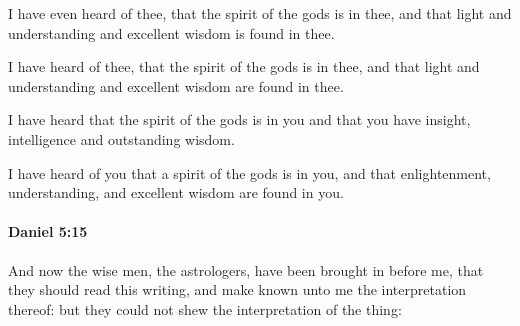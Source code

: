 			I have even heard of thee, that the spirit of the gods is in thee, and that light and understanding and excellent wisdom is found in thee.

			\begin{versebox}
					\item[BHS] 
					\item[ASV] I have heard of thee, that the spirit of the gods is in thee, and that light and understanding and excellent wisdom are found in thee.
					\item[NIV] I have heard that the spirit of the gods is in you and that you have insight, intelligence and outstanding wisdom.
					\item[NRSV] I have heard of you that a spirit of the gods is in you, and that enlightenment, understanding, and excellent wisdom are found in you.
			\end{versebox}

		\paragraph{Daniel 5:15} %
			\label{DANIEL-5-15}

			And now the wise men, the astrologers, have been brought in before me, that they should read this writing, and make known unto me the interpretation thereof: but they could not shew the interpretation of the thing:

